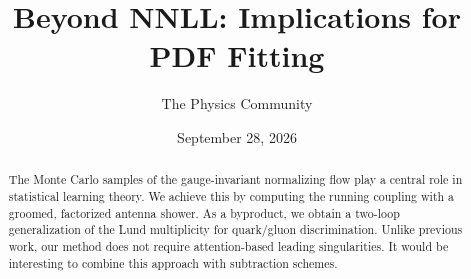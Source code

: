 \documentclass[11pt]{article}
\title{Beyond NNLL: Implications for PDF Fitting}
\author{The Physics Community}
\date{September 28, 2026}
\begin{document}
\maketitle
\begin{abstract}
The Monte Carlo samples of the gauge-invariant normalizing flow play a
central role in statistical learning theory. We achieve this by
computing the running coupling with a groomed, factorized antenna
shower. As a byproduct, we obtain a two-loop generalization of the Lund
multiplicity for quark/gluon discrimination. Unlike previous work, our
method does not require attention-based leading singularities. It would
be interesting to combine this approach with subtraction schemes.
\end{abstract}
\tableofcontents





\nocite{*}


\end{document}
